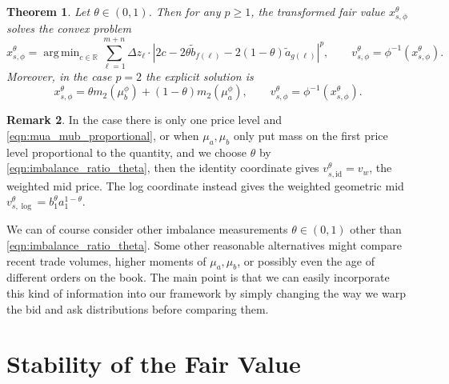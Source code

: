 \documentclass[11pt]{article}
\theoremstyle{plain}
\newtheorem{theorem}{Theorem}[section]
\theoremstyle{definition}
\newtheorem{remark}[theorem]{Remark}
\numberwithin{equation}{section}
\DeclareMathOperator*{\argmin}{arg\,min}
\begin{document}
\begin{theorem}
    Let $\theta \in (0,1)$. Then for any $p \geq 1$, the transformed fair value
    $x_{s,\phi}^\theta$ solves the convex problem
%
\begin{equation}
   x_{s,\phi}^\theta = \argmin_{c \in \mathbb R} \sum_{\ell = 1}^{m+n} \Delta z_\ell \cdot
   |2c - 2\theta \widetilde b_{f(\ell)} - 2(1-\theta)\widetilde a_{g(\ell)}|^p,
   \qquad v_{s,\phi}^\theta=\phi^{-1}(x_{s,\phi}^\theta).
   \label{eqn:wp_imbalanced_symmetric_fair_value}
\end{equation}
%
\noindent Moreover, in the case $p = 2$ the explicit solution is
%
\begin{equation}
    x_{s,\phi}^\theta=\theta m_2(\mu_b^\phi)+(1-\theta)m_2(\mu_a^\phi),
    \qquad v_{s,\phi}^\theta=\phi^{-1}(x_{s,\phi}^\theta).
    \label{eqn:w2_imbalanced_symmetric_fair_value}
\end{equation}
    \label{thm:imbalanced_wasserstein_solution}
\end{theorem}

%
\begin{remark}
    In the case there is only one price level and \eqref{eqn:mua_mub_proportional}, or
    when $\mu_a, \mu_b$ only put mass on the first price level proportional to the quantity,
    and we choose $\theta$ by \eqref{eqn:imbalance_ratio_theta}, then the identity coordinate gives
    $v_{s,\mathrm{id}}^\theta=v_w$, the weighted mid price. The log coordinate instead gives the weighted geometric mid
    $v_{s,\log}^\theta=b_1^\theta a_1^{1-\theta}$.
\end{remark}


\noindent We can of course consider other imbalance measurements
$\theta \in (0,1)$ other than \eqref{eqn:imbalance_ratio_theta}.
Some other reasonable alternatives might compare recent trade
volumes, higher moments of $\mu_a, \mu_b$, or possibly even
the age of different orders on the book. The main point is that
 we can easily incorporate this kind of information into our
 framework by simply changing the way we warp the bid and ask
 distributions before comparing them.

\section{Stability of the Fair Value}
\label{sec:stability_fv}
\end{document}
